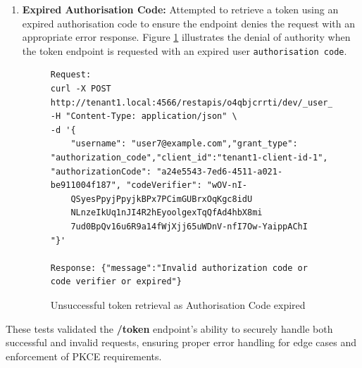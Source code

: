 \begin{enumerate}
\newpage
    \item \textbf{Expired Authorisation Code:} Attempted to retrieve a token using an expired authorisation code to ensure the endpoint denies the request with an appropriate error response. Figure \ref{fig:token_auth_code_expired} illustrates the denial of authority when the token endpoint is requested with an expired user \texttt{authorisation code}.
    
    
    \begin{figure}[!htbp]
    \centering
    \begin{lstlisting}[style=curlstyle]
Request:
curl -X POST http://tenant1.local:4566/restapis/o4qbjcrrti/dev/_user_request_/token\                                      
-H "Content-Type: application/json" \
-d '{
    "username": "user7@example.com","grant_type": "authorization_code","client_id":"tenant1-client-id-1", "authorizationCode": "a24e5543-7ed6-4511-a021-be911004f187", "codeVerifier": "wOV-nI-            
    QSyesPpyjPpyjkBPx7PCimGUBrxOqKgc8idU
    NLnzeIkUq1nJI4R2hEyoolgexTqQfAd4hbX8mi
    7ud0BpQv16u6R9a14fWjXjj65uWDnV-nfI7Ow-YaippAChI
"}'

Response: {"message":"Invalid authorization code or code verifier or expired"}
    \end{lstlisting}
    \caption{Unsuccessful token retrieval as Authorisation Code expired}
    \label{fig:token_auth_code_expired}
\end{figure}
\end{enumerate}

\noindent These tests validated the \textbf{/token} endpoint's ability to securely handle both successful and invalid requests, ensuring proper error handling for edge cases and enforcement of PKCE requirements.

\newpage
